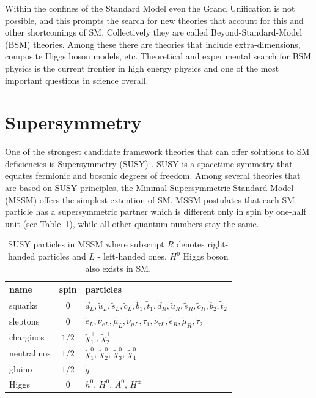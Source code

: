Within the confines of the Standard Model even the Grand Unification is not possible, and this prompts the search for new theories that account for this and other shortcomings of SM. Collectively they are called Beyond-Standard-Model (BSM) theories. Among these there are theories that include extra-dimensions, composite Higgs boson models, etc. Theoretical and experimental search for BSM physics is the current frontier in high energy physics and one of the most important questions in science overall. 


\section{Supersymmetry}
One of the strongest candidate framework theories that can offer solutions to SM deficiencies is Supersymmetry (SUSY) \citep{Lykken:1996xt}. SUSY is a spacetime symmetry that equates fermionic and bosonic degrees of freedom. Among several theories that are based on SUSY principles, the Minimal Supersymmetric Standard Model (MSSM) offers the simplest extention of SM. MSSM postulates that each SM particle has a supersymmetric partner which is  different only in spin by one-half unit (see Table~\ref{tab:MSSMparticles}), while all other quantum numbers stay the same. 
\vspace{0.5cm}
\begin{table}
\captionsetup{width=0.8\textwidth}
\def\arraystretch{1.5}
\centering
\begin{tabular}{|l|c| l|}
\hline 
name & spin & particles \\ 
\hline 
squarks & 0 & $\tilde{d}_{L},\tilde{u}_{L},\tilde{s}_{L},\tilde{c}_{L}, \tilde{b}_{1}, \tilde{t}_{1}, \tilde{d}_R,\tilde{u}_{R},\tilde{s}_{R},\tilde{c}_{R},\tilde{b}_{2}, \tilde{t}_{2} $\\ 
sleptons & 0 & $\tilde{e}_L, \tilde{\nu}_{eL}, \tilde{\mu}_L, \tilde{\nu}_{\mu L}, \tilde{\tau}_1, \tilde{\nu}_{\tau L}, \tilde{e}_R,\tilde{\mu}_R, \tilde{\tau}_2 $\\ 
charginos & $1/2$ & $\tilde{\chi}_1^{\pm} ,\, \tilde{\chi}_2^{\pm}  $ \\ 
neutralinos & $1/2$ & $\tilde{\chi}_1^{0},\, \tilde{\chi}_2^{0},\,\tilde{\chi}_3^{0},\, \tilde{\chi}_4^{0} $\\ 
gluino & $1/2$ & $\tilde{g}$ \\  
Higgs & 0 & $h^{0},\, H^{0},\, A^{0},\, H^{\pm}$ \\ 
\hline 
\end{tabular} 
\caption{\label{tab:MSSMparticles} SUSY particles in MSSM where subscript $R$ denotes right-handed particles and $L$ - left-handed ones. $H^0$ Higgs boson also exists in SM. }
\end{table}
